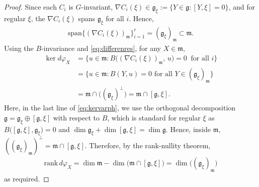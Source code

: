 \documentclass[11pt]{amsart}
\theoremstyle{definition}
\theoremstyle{plain}
\theoremstyle{conclusion}
\begin{document}
\begin{proof}
Since each $C_i$ is $G$-invariant, $\nabla C_i(\xi)\in\mathfrak{g}_\xi:=\{Y\in\mathfrak{g}:[Y,\xi]=0\}$, and for regular $\xi$, the $\nabla C_i(\xi)$ spans $\mathfrak{g}_\xi$ for all $i$. Hence, \begin{align*}
\mathrm{span}\big\{(\nabla C_i(\xi))_{\mathfrak{m}}\big\}_{i=1}^r=(\mathfrak{g}_\xi)_{\mathfrak{m}} \subset\mathfrak{m}.
\end{align*} Using the $B$-invariance and \eqref{eq:differenres}, for any $X \in \mathfrak{m}$, \begin{align}
\ker d\varphi_X &=\big\{u \in\mathfrak{m}:B\big((\nabla C_i(\xi))_{\mathfrak{m}},\,u \big)=0\ \text{ for all } i\big\} \label{eq:kervarph}\\
\nonumber
&=\big\{u \in\mathfrak{m}: B(Y,u)=0  \text{ for all } Y \in(\mathfrak{g}_\xi)_{\mathfrak{m}}\big\}\\
\nonumber
&=\mathfrak{m}\cap \big((\mathfrak{g}_\xi)^\perp\big) =\mathfrak{m}\cap[\mathfrak{g},\xi].
\end{align} Here, in the last line of \eqref{eq:kervarph}, we use the orthogonal decomposition $\mathfrak{g}=\mathfrak{g}_\xi\oplus[\mathfrak{g},\xi]$ with respect to $B$, which is standard for regular $\xi$ as $B\big([\mathfrak{g},\xi],\mathfrak{g}_\xi\big)=0$ and $\dim\mathfrak{g}_\xi+\dim[\mathfrak{g},\xi]=\dim\mathfrak{g}$. Hence, inside $\mathfrak{m}$, $((\mathfrak{g}_\xi)_\mathfrak{m})^\perp = \mathfrak{m} \cap [\mathfrak{g},\xi]$.  Therefore, by the rank-nullity theorem, \begin{align*}
\mathrm{rank}\, d\varphi_X =\dim\mathfrak{m}-\dim\big(\mathfrak{m}\cap[\mathfrak{g},\xi]\big) =\dim\big((\mathfrak{g}_\xi)_{\mathfrak{m}}\big)
\end{align*} as required.
 \end{proof}
\end{document}

